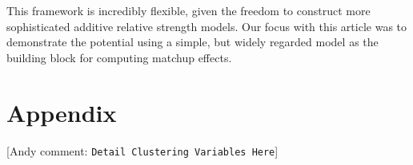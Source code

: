 \documentclass[letterpaper,12pt]{article}
\newcommand{\andyc}[1]{[{\color{red}\sc Andy comment: {\tt #1}}]}
\begin{document}
This framework is incredibly flexible, given the freedom to construct more sophisticated additive relative strength models. Our focus with this article was to demonstrate the potential using a simple, but widely regarded model as the building block for computing matchup effects.

\section*{Appendix}
\andyc{Detail Clustering Variables Here}








\end{document}
